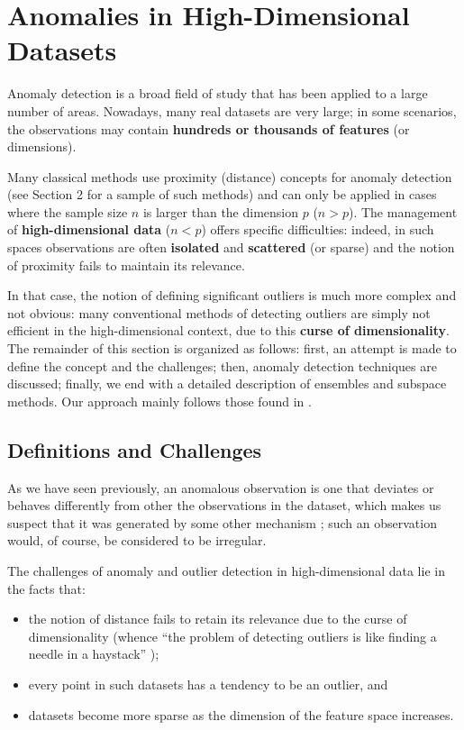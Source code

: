 
\section{Anomalies in High-Dimensional Datasets}\label{Section:4}
%
%
% 
Anomaly detection is a broad field of study that has been applied to a large number of areas. Nowadays, many real datasets are very large; in some scenarios, the observations may contain \textbf{hundreds or thousands of features} (or dimensions).
\par Many classical methods use proximity (distance) concepts for anomaly detection (see Section 2 for a sample of such methods) and can only be applied in cases where the sample size $n$ is larger than the dimension $p$ ($n>p$). 
\newl
The management of \textbf{high-dimensional data} ($n<p$) offers specific difficulties: indeed, in such spaces observations are often \textbf{isolated} and \textbf{scattered} (or sparse) and the notion of proximity fails to maintain its relevance. 
\par In that case, the notion of defining significant outliers is much more complex and not obvious: many conventional methods of detecting outliers are simply not efficient in the high-dimensional context, due to this \textbf{curse of dimensionality}.\newl
The remainder of this section is organized as follows: first, an attempt is made to define the concept and the challenges; then, anomaly detection techniques are discussed; finally, we end with a detailed description of ensembles and subspace methods. Our approach mainly follows those found in \cite{A1,A8,A10,A14,Aurore}.
%
%
\subsection{Definitions and Challenges}

As we have seen previously, an anomalous observation is one that deviates or behaves differently from other the observations in the dataset, which makes us suspect that it was generated by some other mechanism \cite{A1}; such an observation would, of course, be considered to be irregular. 

%
The challenges of anomaly and outlier detection  in high-dimensional data lie in the facts that:
\begin{itemize}[noitemsep]
\item the notion of distance fails to retain its relevance due to the curse of dimensionality (whence ``the problem of detecting outliers is like finding a needle in a haystack'' \cite{A14});
\item every point in such datasets has a tendency to be an outlier, and 
\item datasets become more sparse as the dimension of the feature space increases.
\end{itemize}

